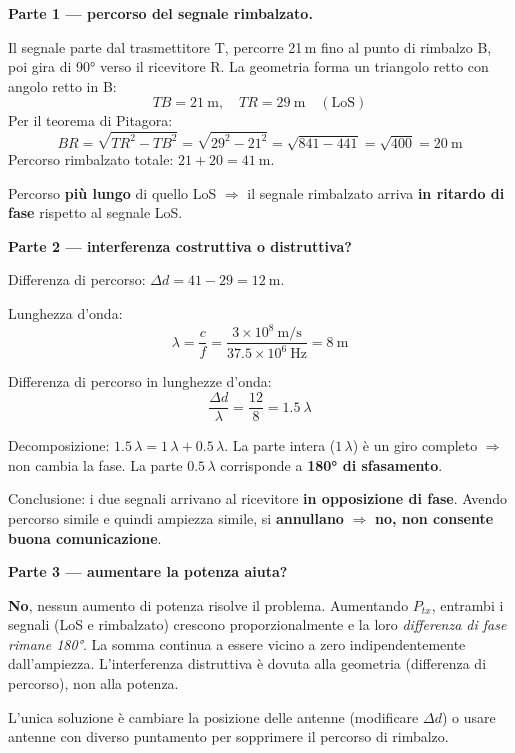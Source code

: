 \documentclass{report}
\begin{document}
\begin{solution}
\textbf{Parte 1 --- percorso del segnale rimbalzato.}

Il segnale parte dal trasmettitore T, percorre 21\,m fino al punto di rimbalzo B,
poi gira di 90° verso il ricevitore R. La geometria forma un triangolo retto
con angolo retto in B:
\[
  TB = 21\ \text{m}, \quad TR = 29\ \text{m} \quad (\text{LoS})
\]
Per il teorema di Pitagora:
\[
  BR = \sqrt{TR^2 - TB^2} = \sqrt{29^2 - 21^2} = \sqrt{841-441} = \sqrt{400} = 20\ \text{m}
\]
Percorso rimbalzato totale: $21 + 20 = 41\ \text{m}$.

Percorso \textbf{più lungo} di quello LoS $\Rightarrow$ il segnale rimbalzato
arriva \textbf{in ritardo di fase} rispetto al segnale LoS.

\medskip
\textbf{Parte 2 --- interferenza costruttiva o distruttiva?}

Differenza di percorso: $\Delta d = 41 - 29 = 12\ \text{m}$.

Lunghezza d'onda:
\[
  \lambda = \frac{c}{f} = \frac{3\times10^8\ \text{m/s}}{37.5\times10^6\ \text{Hz}} = 8\ \text{m}
\]

Differenza di percorso in lunghezze d'onda:
\[
  \frac{\Delta d}{\lambda} = \frac{12}{8} = 1.5\ \lambda
\]

Decomposizione: $1.5\,\lambda = 1\,\lambda + 0.5\,\lambda$. La parte intera ($1\,\lambda$)
è un giro completo $\Rightarrow$ non cambia la fase. La parte $0.5\,\lambda$
corrisponde a \textbf{180° di sfasamento}.

Conclusione: i due segnali arrivano al ricevitore \textbf{in opposizione di fase}.
Avendo percorso simile e quindi ampiezza simile, si \textbf{annullano}
$\Rightarrow$ \textbf{no, non consente buona comunicazione}.

\medskip
\textbf{Parte 3 --- aumentare la potenza aiuta?}

\textbf{No}, nessun aumento di potenza risolve il problema. Aumentando $P_{tx}$,
entrambi i segnali (LoS e rimbalzato) crescono proporzionalmente e la loro
\emph{differenza di fase rimane 180°}. La somma continua a essere vicino a zero
indipendentemente dall'ampiezza. L'interferenza distruttiva è dovuta alla
geometria (differenza di percorso), non alla potenza.

L'unica soluzione è cambiare la posizione delle antenne (modificare $\Delta d$)
o usare antenne con diverso puntamento per sopprimere il percorso di rimbalzo.
\end{solution}

\end{document}
